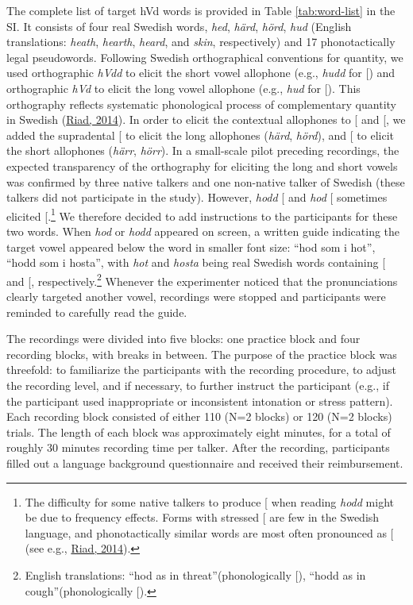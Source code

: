 \documentclass[utf8]{frontiersSCNS}
\begin{document}
The complete list of target hVd words is provided in Table \ref{tab:word-list} in the SI. It consists of four real Swedish words, \emph{hed}, \emph{härd}, \emph{hörd}, \emph{hud} (English translations: \emph{heath}, \emph{hearth}, \emph{heard}, and \emph{skin}, respectively) and 17 phonotactically legal pseudowords. Following Swedish orthographical conventions for quantity, we used orthographic \emph{hVdd} to elicit the short vowel allophone (e.g., \emph{hudd} for {[}\ipatext{ɵ}{]}) and orthographic \emph{hVd} to elicit the long vowel allophone (e.g., \emph{hud} for {[}\ipatext{ʉː}{]}). This orthography reflects systematic phonological process of complementary quantity in Swedish (\protect\hyperlink{ref-riad2014}{Riad, 2014}). In order to elicit the contextual allophones to {[}\ipatext{ɛ}{]} and {[}\ipatext{ø}{]}, we added the supradental {[}\ipatext{ɖ}{]} to elicit the long allophones (\emph{härd}, \emph{hörd}), and {[}\ipatext{r}{]} to elicit the short allophones (\emph{härr}, \emph{hörr}). In a small-scale pilot preceding recordings, the expected transparency of the orthography for eliciting the long and short vowels was confirmed by three native talkers and one non-native talker of Swedish (these talkers did not participate in the study). However, \emph{hodd} {[}\ipatext{ʊ}{]} and \emph{hod} {[}\ipatext{uː}{]} sometimes elicited {[}\ipatext{ɔ}{]}.\footnote{The difficulty for some native talkers to produce {[}\ipatext{ʊ}{]} when reading \emph{hodd} might be due to frequency effects. Forms with stressed {[}\ipatext{ʊ}{]} are few in the Swedish language, and phonotactically similar words are most often pronounced as {[}\ipatext{ɔ}{]} (see e.g., \protect\hyperlink{ref-riad2014}{Riad, 2014}).} We therefore decided to add instructions to the participants for these two words. When \emph{hod} or \emph{hodd} appeared on screen, a written guide indicating the target vowel appeared below the word in smaller font size: ``hod som i hot'', ``hodd som i hosta'', with \emph{hot} and \emph{hosta} being real Swedish words containing {[}\ipatext{uː}{]} and {[}\ipatext{ʊ}{]}, respectively.\footnote{English translations: ``hod as in threat''(phonologically {[}\ipatext{uː}{]}), ``hodd as in cough''(phonologically {[}\ipatext{ʊ}{]}).} Whenever the experimenter noticed that the pronunciations clearly targeted another vowel, recordings were stopped and participants were reminded to carefully read the guide.

The recordings were divided into five blocks: one practice block and four recording blocks, with breaks in between. The purpose of the practice block was threefold: to familiarize the participants with the recording procedure, to adjust the recording level, and if necessary, to further instruct the participant (e.g., if the participant used inappropriate or inconsistent intonation or stress pattern). Each recording block consisted of either 110 (N=2 blocks) or 120 (N=2 blocks) trials. The length of each block was approximately eight minutes, for a total of roughly 30 minutes recording time per talker. After the recording, participants filled out a language background questionnaire and received their reimbursement.
\end{document}
